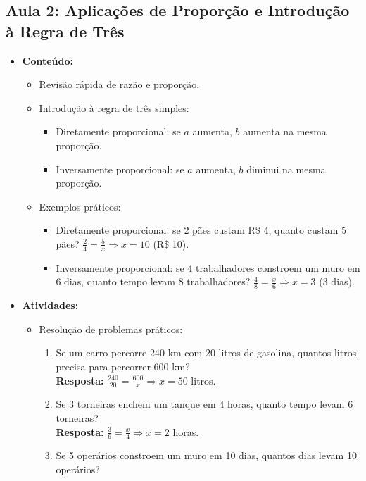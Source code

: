 \documentclass{article}
\begin{document}
\subsection*{Aula 2: Aplicações de Proporção e Introdução à Regra de Três}
\begin{itemize}
    \item \textbf{Conteúdo:}
    \begin{itemize}
        \item Revisão rápida de razão e proporção.
        \item Introdução à regra de três simples:
            \begin{itemize}
                \item Diretamente proporcional: se \( a \) aumenta, \( b \) aumenta na mesma proporção.
                \item Inversamente proporcional: se \( a \) aumenta, \( b \) diminui na mesma proporção.
            \end{itemize}
        \item Exemplos práticos:
            \begin{itemize}
                \item Diretamente proporcional: se 2 pães custam R\$ 4, quanto custam 5 pães? \( \frac{2}{4} = \frac{5}{x} \Rightarrow x = 10 \) (R\$ 10).
                \item Inversamente proporcional: se 4 trabalhadores constroem um muro em 6 dias, quanto tempo levam 8 trabalhadores? \( \frac{4}{8} = \frac{x}{6} \Rightarrow x = 3 \) (3 dias).
            \end{itemize}
    \end{itemize}
    \item \textbf{Atividades:}
    \begin{itemize}
        \item Resolução de problemas práticos:
            \begin{enumerate}
                \item Se um carro percorre 240 km com 20 litros de gasolina, quantos litros precisa para percorrer 600 km? \\
                      \textbf{Resposta:} \( \frac{240}{20} = \frac{600}{x} \Rightarrow x = 50 \) litros.
                \item Se 3 torneiras enchem um tanque em 4 horas, quanto tempo levam 6 torneiras? \\
                      \textbf{Resposta:} \( \frac{3}{6} = \frac{x}{4} \Rightarrow x = 2 \) horas.
                \item Se 5 operários constroem um muro em 10 dias, quantos dias levam 10 operários? \\

\end{enumerate}
\end{itemize}
\end{itemize}
\end{document}

